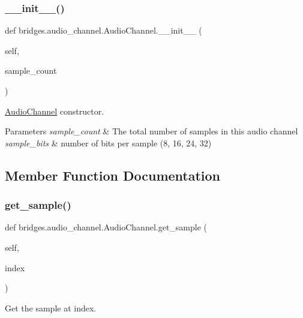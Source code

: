 \subsubsection{\texorpdfstring{\+\_\+\+\_\+init\+\_\+\+\_\+()}{\_\_init\_\_()}}
{\footnotesize\ttfamily def bridges.\+audio\+\_\+channel.\+Audio\+Channel.\+\_\+\+\_\+init\+\_\+\+\_\+ (\begin{DoxyParamCaption}\item[{}]{self,  }\item[{}]{sample\+\_\+count }\end{DoxyParamCaption})}



\hyperlink{classbridges_1_1audio__channel_1_1_audio_channel}{Audio\+Channel} constructor. 


\begin{DoxyParams}{Parameters}
{\em sample\+\_\+count} & The total number of samples in this audio channel \\
\hline
{\em sample\+\_\+bits} & number of bits per sample (8, 16, 24, 32) \\
\hline
\end{DoxyParams}


\subsection{Member Function Documentation}
\mbox{\label{classbridges_1_1audio__channel_1_1_audio_channel_a1f695d07aa5c95866036b0a55f88d9ae}} 
\subsubsection{\texorpdfstring{get\+\_\+sample()}{get\_sample()}}
{\footnotesize\ttfamily def bridges.\+audio\+\_\+channel.\+Audio\+Channel.\+get\+\_\+sample (\begin{DoxyParamCaption}\item[{}]{self,  }\item[{}]{index }\end{DoxyParamCaption})}



Get the sample at index. 

